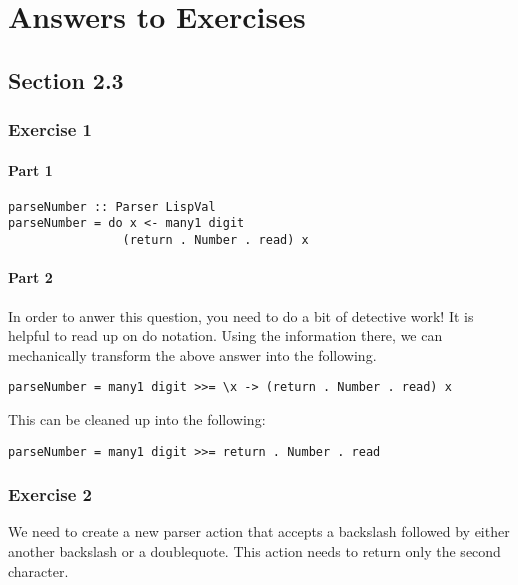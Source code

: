\chapter{Answers to Exercises}
 
 
\section{Section 2.3}
 
\subsection{Exercise 1}
 
\subsubsection{Part 1}
 
\begin{lstlisting}
parseNumber :: Parser LispVal
parseNumber = do x <- many1 digit
                (return . Number . read) x
\end{lstlisting}
 
\subsubsection{Part 2}
 
In order to anwer this question, you need to do a bit of detective work! It is helpful to read up on do notation. Using the information there, we can mechanically transform the above answer into the following.
 
\begin{lstlisting}
parseNumber = many1 digit >>= \x -> (return . Number . read) x
\end{lstlisting}
 
This can be cleaned up into the following:
 
\begin{lstlisting}
parseNumber = many1 digit >>= return . Number . read
\end{lstlisting}
 
\subsection{Exercise 2}
 
We need to create a new parser action that accepts a backslash followed by either another backslash or a doublequote. This action needs to return only the second character.
 
